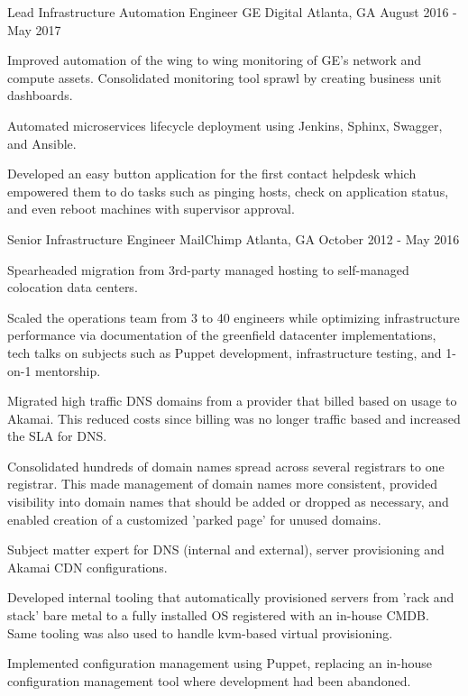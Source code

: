 \begin{cventries}
  \cventry
    {Lead Infrastructure Automation Engineer} %
    {GE Digital} %
    {Atlanta, GA} %
    {August 2016 - May 2017} %
    {
      \begin{cvitems}
        \item {Improved automation of the wing to wing monitoring of GE's network and compute assets. Consolidated monitoring tool sprawl by creating business unit dashboards.}
        \item {Automated microservices lifecycle deployment using Jenkins, Sphinx, Swagger, and Ansible.}
        \item {Developed an easy button application for the first contact helpdesk which empowered them to do tasks such as pinging hosts, check on application status, and even reboot machines with supervisor approval.}
      \end{cvitems}
    }

  \cventry
    {Senior Infrastructure Engineer} %
    {MailChimp} %
    {Atlanta, GA} %
    {October 2012 - May 2016} %
    {
      \begin{cvitems}
        \item {Spearheaded migration from 3rd-party managed hosting to self-managed colocation data centers.}
        \item {Scaled the operations team from 3 to 40 engineers while optimizing infrastructure performance via documentation of the greenfield datacenter implementations, tech talks on subjects such as Puppet development, infrastructure testing, and 1-on-1 mentorship.}
        \item {Migrated high traffic DNS domains from a provider that billed based on usage to Akamai. This reduced costs since billing was no longer traffic based and increased the SLA for DNS.}
        \item {Consolidated hundreds of domain names spread across several registrars to one registrar. This made management of domain names more consistent, provided visibility into domain names that should be added or dropped as necessary, and enabled creation of a customized 'parked page' for unused domains.}
        \item {Subject matter expert for DNS (internal and external), server provisioning and Akamai CDN configurations.}
        \item {Developed internal tooling that automatically provisioned servers from 'rack and stack' bare metal to a fully installed OS registered with an in-house CMDB. Same tooling was also used to handle kvm-based virtual provisioning.}
        \item {Implemented configuration management using Puppet, replacing an in-house configuration management tool where development had been abandoned.}
      \end{cvitems}
    }
 


\end{cventries}
